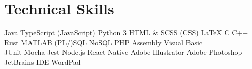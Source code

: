 \documentclass[]{deedy-resume-openfont}
\begin{document}
\section{Technical Skills}
Java \textbullet{} TypeScript (JavaScript) \textbullet{} Python 3 \textbullet{} HTML \& SCSS (CSS) \textbullet{} \LaTeX \textbullet{} C \textbullet{} C++ \textbullet{} Rust \textbullet{} MATLAB \textbullet{} (PL/)SQL \textbullet{} NoSQL \textbullet{} PHP \textbullet{} Assembly \textbullet{} Visual Basic\\
JUnit \textbullet{} Mocha \textbullet{} Jest \textbullet{} Node.js \textbullet{} React Native \textbullet{} Adobe Illustrator \textbullet{} Adobe Photoshop \textbullet{} JetBrains IDE \textbullet{} WordPad
\sectionsep
\end{document}
